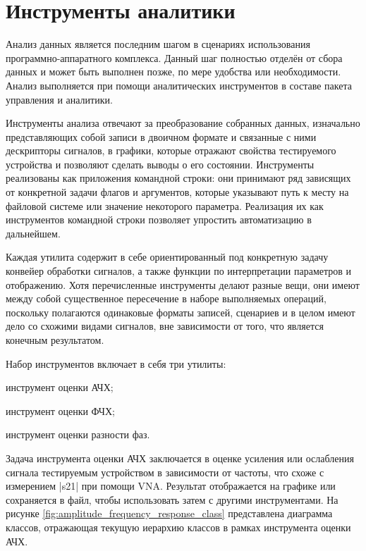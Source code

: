 \documentclass{report}
\begin{document}
\section{Инструменты аналитики}

Анализ данных является последним шагом в сценариях использования программно-аппаратного комплекса. Данный шаг полностью отделён от сбора данных и может быть выполнен позже, по мере удобства или необходимости. Анализ выполняется при помощи аналитических инструментов в составе пакета управления и аналитики.

Инструменты анализа отвечают за преобразование собранных данных, изначально представляющих собой записи в двоичном формате и связанные с ними дескрипторы сигналов, в графики, которые отражают свойства тестируемого устройства и позволяют сделать выводы о его состоянии. Инструменты реализованы как приложения командной строки: они принимают ряд зависящих от конкретной задачи флагов и аргументов, которые указывают путь к месту на файловой системе или значение некоторого параметра. Реализация их как инструментов командной строки позволяет упростить автоматизацию в дальнейшем.

Каждая утилита содержит в себе ориентированный под конкретную задачу конвейер обработки сигналов, а также функции по интерпретации параметров и отображению. Хотя перечисленные инструменты делают разные вещи, они имеют между собой существенное пересечение в наборе выполняемых операций, поскольку полагаются одинаковые форматы записей, сценариев и в целом имеют дело со схожими видами сигналов, вне зависимости от того, что является конечным результатом.

Набор инструментов включает в себя три утилиты:

\begin{enummarker}
    \item инструмент оценки АЧХ;
    \item инструмент оценки ФЧХ;
    \item инструмент оценки разности фаз.
\end{enummarker}

Задача инструмента оценки АЧХ заключается в оценке усиления или ослабления сигнала тестируемым устройством в зависимости от частоты, что схоже с измерением |s21| при помощи VNA. Результат отображается на графике или сохраняется в файл, чтобы использовать затем с другими инструментами. На рисунке \ref{fig:amplitude_frequency_response_class} представлена диаграмма классов, отражающая текущую иерархию классов в рамках инструмента оценки АЧХ.
\end{document}
